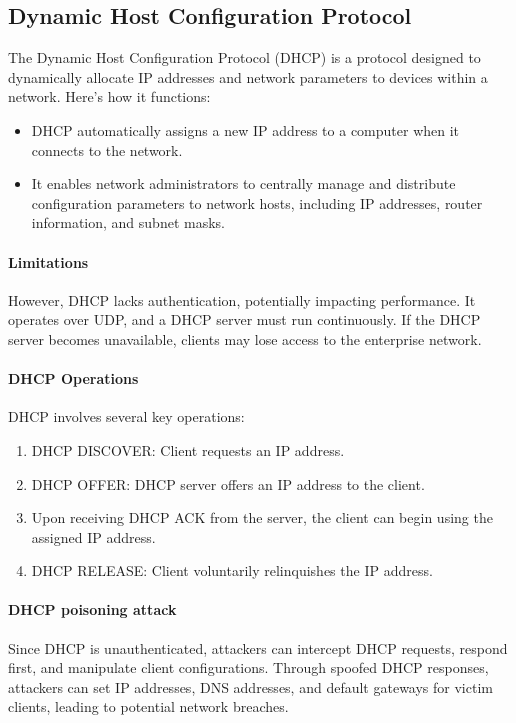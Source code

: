 \subsection{Dynamic Host Configuration Protocol}
The Dynamic Host Configuration Protocol (DHCP) is a protocol designed to dynamically allocate IP addresses and network parameters to devices within a network. 
Here's how it functions:
\begin{itemize}
    \item DHCP automatically assigns a new IP address to a computer when it connects to the network.
    \item It enables network administrators to centrally manage and distribute configuration parameters to network hosts, including IP addresses, router information, and subnet masks.
\end{itemize}

\paragraph*{Limitations}
However, DHCP lacks authentication, potentially impacting performance. 
It operates over UDP, and a DHCP server must run continuously. 
If the DHCP server becomes unavailable, clients may lose access to the enterprise network.

\paragraph*{DHCP Operations}
DHCP involves several key operations:
\begin{enumerate}
    \item DHCP DISCOVER: Client requests an IP address.
    \item  DHCP OFFER: DHCP server offers an IP address to the client.
    \item Upon receiving DHCP ACK from the server, the client can begin using the assigned IP address.
    \item DHCP RELEASE: Client voluntarily relinquishes the IP address.
\end{enumerate}

\paragraph*{DHCP poisoning attack}
Since DHCP is unauthenticated, attackers can intercept DHCP requests, respond first, and manipulate client configurations. 
Through spoofed DHCP responses, attackers can set IP addresses, DNS addresses, and default gateways for victim clients, leading to potential network breaches.